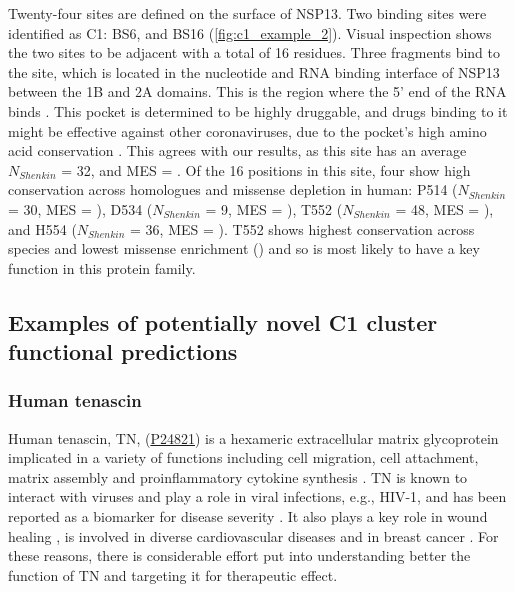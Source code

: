 Twenty-four sites are defined on the surface of NSP13. Two binding sites were identified as C1: BS6, and BS16 (\autoref{fig:c1_example_2}). Visual inspection shows the two sites to be adjacent with a total of 16 residues. Three fragments bind to the site, which is located in the nucleotide and RNA binding interface of NSP13 between the 1B and 2A domains. This is the region where the 5’ end of the RNA binds \cite{YAN_2020_SARSCOV2}. This pocket is determined to be highly druggable, and drugs binding to it might be effective against other coronaviruses, due to the pocket’s high amino acid conservation \cite{NEWMAN_2021_SARSCOV2}. This agrees with our results, as this site has an average $N_{Shenkin}$ = 32, and MES = . Of the 16 positions in this site, four show high conservation across homologues and missense depletion in human: P514 ($N_{Shenkin}$ = 30, MES = ), D534 ($N_{Shenkin}$ = 9, MES = ), T552 ($N_{Shenkin}$ = 48, MES = ), and H554 ($N_{Shenkin}$ = 36, MES = ). T552 shows highest conservation across species and lowest missense enrichment () and so is most likely to have a key function in this protein family.

\subsection{Examples of potentially novel C1 cluster functional predictions}

\subsubsection{Human tenascin}

Human tenascin, TN, (\href{https://www.uniprot.org/uniprotkb/P24821/entry}{P24821}) is a hexameric extracellular matrix glycoprotein implicated in a variety of functions including cell migration, cell attachment, matrix assembly and proinflammatory cytokine synthesis \cite{BHATTACHARYYA_2022_TNC}. TN is known to interact with viruses and play a role in viral infections, e.g., HIV-1, and has been reported as a biomarker for disease severity \cite{ZULIANI_2023_TNC}. It also plays a key role in wound healing \cite{WANG_2022_TNC}, is involved in diverse cardiovascular diseases \cite{KHOMTCHOUK_2022_TNC} and in breast cancer \cite{LEPUCKI_2022_TNC}. For these reasons, there is considerable effort put into understanding better the function of TN and targeting it for therapeutic effect.

